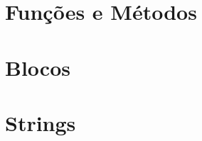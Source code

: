 \documentclass[t, 				             
			   final,
			   12pt, 				         
			   xcolor={usenames,dvipsnames}, 
			   table]{beamer}
\begin{document}
	
	
	 
	\section{Funções e Métodos}
	
	\section{Blocos}	
	
	\section{Strings}	
	
	
\end{document}
